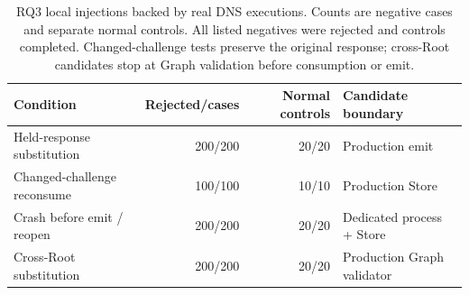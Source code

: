 \begin{table}[t]
\centering\small
\setlength{\tabcolsep}{3.5pt}
\caption{RQ3 local injections backed by real DNS executions. Counts are negative cases and separate normal controls. All listed negatives were rejected and controls completed. Changed-challenge tests preserve the original response; cross-Root candidates stop at Graph validation before consumption or emit.}
\label{tab:rq3-physical}
\begin{tabularx}{\textwidth}{@{}Xr r X@{}}
\toprule
Condition & Rejected/cases & Normal controls & Candidate boundary \\
\midrule
Held-response substitution & 200/200 & 20/20 & Production emit \\
Changed-challenge reconsume & 100/100 & 10/10 & Production Store \\
Crash before emit / reopen & 200/200 & 20/20 & Dedicated process + Store \\
Cross-Root substitution & 200/200 & 20/20 & Production Graph validator \\
\bottomrule
\end{tabularx}
\end{table}
